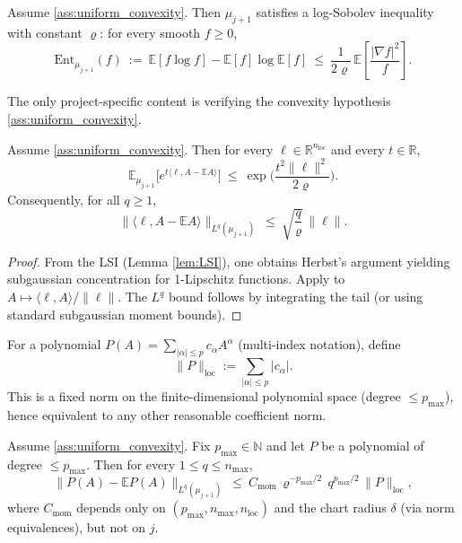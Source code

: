 \begin{lemma}\label{lem:LSI}
Assume \ref{ass:uniform_convexity}. Then $\mu_{j+1}$ satisfies a log-Sobolev inequality with constant $\varrho$:
for every smooth $f\ge 0$,
\[
\mathrm{Ent}_{\mu_{j+1}}(f)\ :=\ \mathbb E[f\log f]-\mathbb E[f]\log\mathbb E[f]
\ \le\ \frac{1}{2\varrho}\,\mathbb E\!\left[\frac{|\nabla f|^2}{f}\right].
\]
\end{lemma}

The only project-specific content is verifying the convexity hypothesis \ref{ass:uniform_convexity}.

\begin{lemma}\label{lem:subgauss}
Assume \ref{ass:uniform_convexity}. Then for every $\ell\in\mathbb R^{n_{\mathrm{loc}}}$ and every $t\in\mathbb R$,
\[
\mathbb E_{\mu_{j+1}}\big[e^{t\langle \ell, A-\mathbb E A\rangle}\big]\ \le\ \exp\!\Big(\frac{t^2\|\ell\|^2}{2\varrho}\Big).
\]
Consequently, for all $q\ge 1$,
\[
\| \langle \ell, A-\mathbb E A\rangle\|_{L^q(\mu_{j+1})}\ \le\ \sqrt{\frac{q}{\varrho}}\,\|\ell\|.
\]
\end{lemma}

\begin{proof}
From the LSI (Lemma \ref{lem:LSI}), one obtains Herbst's argument yielding subgaussian concentration for 1-Lipschitz functions.
Apply to $A\mapsto \langle \ell,A\rangle/\|\ell\|$.
The $L^q$ bound follows by integrating the tail (or using standard subgaussian moment bounds).
\end{proof}

\begin{definition}\label{def:loc_norm}
For a polynomial $P(A)=\sum_{|\alpha|\le p} c_\alpha A^\alpha$ (multi-index notation), define
\[
\|P\|_{\mathrm{loc}}:=\sum_{|\alpha|\le p} |c_\alpha|.
\]
This is a fixed norm on the finite-dimensional polynomial space (degree $\le p_{\max}$), hence equivalent to any other reasonable coefficient norm.
\end{definition}

\begin{lemma}\label{lem:poly_mom}
Assume \ref{ass:uniform_convexity}. Fix $p_{\max}\in\mathbb N$ and let $P$ be a polynomial of degree $\le p_{\max}$.
Then for every $1\le q\le n_{\max}$,
\begin{equation}\label{eq:poly_Lq}
\|P(A)-\mathbb E P(A)\|_{L^q(\mu_{j+1})}\ \le\ C_{\mathrm{mom}}\,\varrho^{-p_{\max}/2}\,q^{p_{\max}/2}\,\|P\|_{\mathrm{loc}},
\end{equation}
where $C_{\mathrm{mom}}$ depends only on $(p_{\max},n_{\max},n_{\mathrm{loc}})$ and the chart radius $\delta$ (via norm equivalences), but not on $j$.
\end{lemma}

